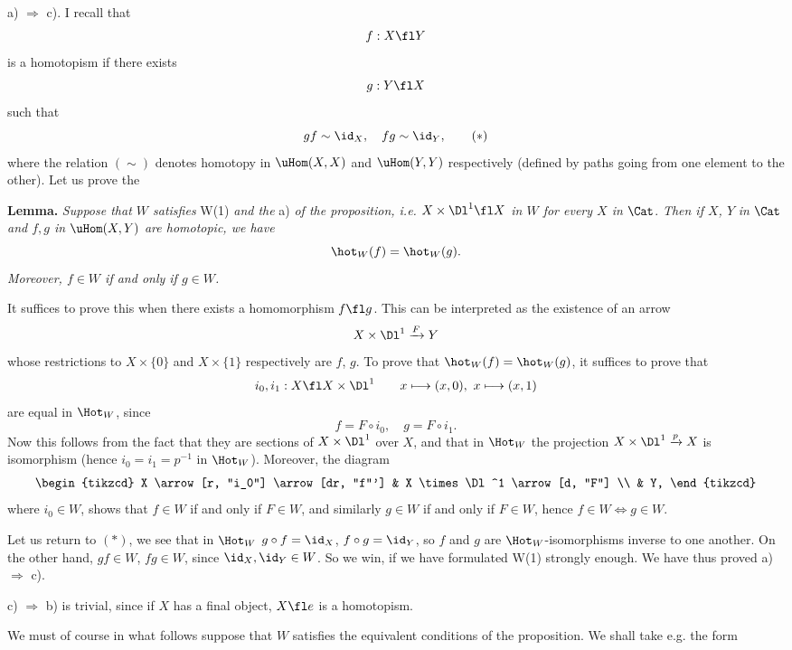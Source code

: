 a) $\Longrightarrow$ c). I recall that
\[ f : X \fl Y \]
is a homotopism if there exists
\[ g : Y \fl X \]
such that
\[ gf \sim \id_X, \quad fg \sim \id_Y, \tag*{$(*)$} \]
where the relation $(\sim)$ denotes homotopy in $\uHom(X,X)$ and $\uHom(Y,Y)$ respectively (defined by paths going from one element to the other). Let us prove the

\textbf{Lemma.} \textit{Suppose that $W$ satisfies} W(1) \textit{and the} a) \textit{of the proposition, i.e. $X \times \Dl^1 \fl X$ in $W$ for every $X$ in} $\Cat$. \textit{Then if $X$, $Y$} \textit{in} $\Cat$ \textit{and $f, g$ in} $\uHom(X,Y)$ \textit{are homotopic, we have}
\[ \hot_W(f) = \hot_W(g). \]
\textit{Moreover, $f \in W$ if and only if $g \in W$.}

It suffices to prove this when there exists a homomorphism $f \fl g$. This can be interpreted as the existence of an arrow
\[ X \times \Dl^1 \xrightarrow{F} Y \]
whose restrictions to $X \times \{0\}$ and $X \times \{1\}$ respectively are $f$, $g$. To prove that $\hot_W(f) = \hot_W(g)$, it suffices to prove that
\[ i_0, i_1 : X \fl X \times \Dl^1 \qquad x \longmapsto (x,0),\ x \longmapsto (x,1) \]
are equal in $\Hot_W$, since
\[ f = F \circ i_0, \quad g = F \circ i_1. \]
Now this follows from the fact that they are sections of $X \times \Dl^1$ over $X$, and that in $\Hot_W$ the projection $X \times \Dl^1 \xrightarrow{p} X$ is isomorphism (hence $i_0 = i_1 = p^{-1}$ in $\Hot_W$). Moreover, the diagram
\[
\begin{tikzcd}
X \arrow[r, "i_0"] \arrow[dr, "f"'] & X \times \Dl^1 \arrow[d, "F"] \\
& Y,
\end{tikzcd}
\]
where $i_0 \in W$, shows that $f \in W$ if and only if $F \in W$, and similarly $g \in W$ if and only if $F \in W$, hence $f \in W \Longleftrightarrow g \in W$.

Let us return to $(*)$, we see that in $\Hot_W$ $g \circ f = \id_X$, $f \circ g = \id_Y$, so $f$ and $g$ are $\Hot_W$-isomorphisms inverse to one another. On the other hand, $gf \in W$, $fg \in W$, since $\id_X, \id_Y \in W$. So we win, if we have formulated W(1) strongly enough. We have thus proved a) $\Longrightarrow$ c).

c) $\Longrightarrow$ b) is trivial, since if $X$ has a final object, $X \fl e$ is a homotopism.


We must of course in what follows suppose that $W$ satisfies the equivalent conditions of the proposition. We shall take e.g. the form

